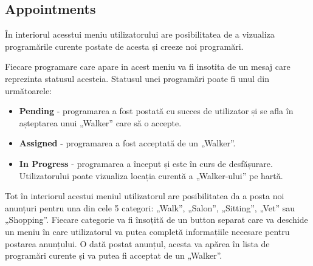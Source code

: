 \subsection{Appointments}

În interiorul acesstui meniu utilizatorului are posibilitatea de a vizualiza programările curente postate de acesta și creeze noi programări. 
 
Fiecare programare care apare in acest meniu va fi insotita de un mesaj care reprezinta statusul acesteia. Statusul unei programări poate fi unul din următoarele:

\begin{itemize}
    \item \textbf{Pending} - programarea a fost postată cu succes de utilizator și se afla în așteptarea unui „Walker” care să o accepte.
    \item \textbf{Assigned} - programarea a fost acceptată de un „Walker”.
    \item \textbf{In Progress} - programarea a început și este în curs de desfășurare. Utilizatorului poate vizualiza locația curentă a „Walker-ului” pe hartă.
\end{itemize}

Tot în interiorul acestui meniul utilizatorul are posibilitatea da a posta noi anunțuri pentru una din cele 5 categori: „Walk”, „Salon”, „Sitting”, „Vet” sau „Shopping”. Fiecare categorie va fi însoțită de un button separat care va deschide un meniu în care utilizatorul va putea completă informațiile necesare pentru postarea anunțului. O dată postat anunțul, acesta va apărea în lista de programări curente și va putea fi acceptat de un „Walker”. 

